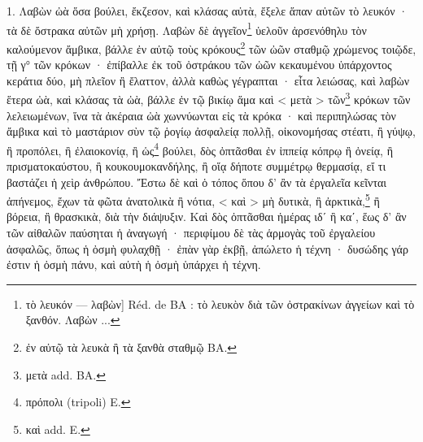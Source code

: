 \documentclass[landscape, a4paper, 11pt, oneside, polutonikogreek, french]{article}
\begin{document}
1. Λαβὼν ὠὰ ὅσα βούλει, ἔκζεσον, καὶ κλάσας αὐτὰ, ἔξελε ἅπαν αὐτῶν τὸ λευκόν · τὰ δὲ ὄστρακα αὐτῶν μὴ χρήσῃ. Λαβὼν δὲ ἀγγεῖον\footnote{τὸ λευκόν --- λαβὼν] Réd. de BA : τὸ λευκὸν διὰ τῶν ὀστρακίνων ἀγγείων καὶ τὸ ξανθόν. Λαβὼν ...} ὑελοῦν ἀρσενόθηλυ τὸν καλούμενον ἄμβικα, βάλλε ἐν αὐτῷ τοὺς κρόκους\footnote{ἐν αὐτῷ τὰ λευκὰ ἢ τὰ ξανθὰ σταθμῷ BA.} τῶν ὠῶν σταθμῷ χρώμενος τοιῷδε, τῇ γ° τῶν κρόκων · ἐπίβαλλε ἐκ τοῦ ὀστράκου τῶν ὠῶν κεκαυμένου ὑπάρχοντος κεράτια δύο, μὴ πλεῖον ἢ ἔλαττον, ἀλλὰ καθὼς γέγραπται · εἶτα λειώσας, καὶ λαβὼν ἕτερα ὠὰ, καὶ κλάσας τὰ ὠὰ, βάλλε ἐν τῷ βικίῳ ἅμα καὶ < μετὰ > τῶν\footnote{μετὰ add. BA.} κρόκων τῶν λελειωμένων, ἵνα τὰ ἀκέραια ὠὰ χωννύωνται εἰς τὰ κρόκα · καὶ περιπηλώσας τὸν ἄμβικα καὶ τὸ μαστάριον σὺν τῷ ῥογίῳ ἀσφαλείᾳ πολλῇ, οἰκονομήσας στέατι, ἢ γύψῳ, ἢ προπόλει, ἢ ἐλαιοκονίᾳ, ἢ ὡς\footnote{πρόπολι (tripoli) E.} βούλει, δὸς ὀπτᾶσθαι ἐν ἱππείᾳ κόπρῳ ἢ ὀνείᾳ, ἢ πρισματοκαύστου, ἢ κουκουμοκανδήλης, ἢ οἵᾳ δήποτε συμμέτρῳ θερμασίᾳ, εἴ τι βαστάζει ἡ χεὶρ ἀνθρώπου. Ἔστω δὲ καὶ ὁ τόπος ὅπου δ' ἂν τὰ ἐργαλεῖα κεῖνται ἀπήνεμος, ἔχων τὰ φῶτα ἀνατολικὰ ἢ νότια, < καὶ > μὴ δυτικὰ, ἢ ἀρκτικὰ,\footnote{καὶ add. E.} ἢ βόρεια, ἢ θρασκικὰ, διὰ τὴν διάψυξιν. Καὶ δὸς ὀπτᾶσθαι ἡμέρας ιδʹ ἢ καʹ, ἕως δ' ἂν τῶν αἰθαλῶν παύσηται ἡ ἀναγωγή · περιφίμου δὲ τὰς ἁρμογὰς τοῦ ἐργαλείου ἀσφαλῶς, ὅπως ἡ ὀσμὴ φυλαχθῇ · ἐπὰν γὰρ ἐκβῇ, ἀπώλετο ἡ τέχνη · δυσώδης γάρ ἐστιν ἡ ὀσμὴ πάνυ, καὶ αὐτὴ ἡ ὀσμὴ ὑπάρχει ἡ τέχνη.
\end{document}
